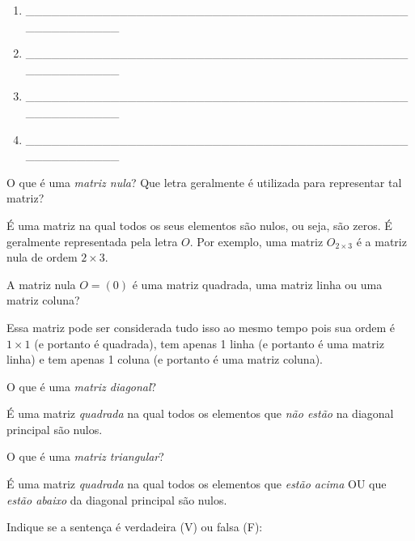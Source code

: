 \documentclass[pdftex, brazil, 12pt, oneside, addpoints, answers]{exam}
\begin{document}
\begin{questions}
\begin{enumerate}
  \item \_\_\_\_\_\_\_\_\_\_\_\_\_\_\_\_\_\_\_\_\_\_\_\_\_\_\_\_\_\_\_\_\_\_\_\_\_\_\_\_\_\_\_\_\_\_\_\_\_\_\_\_\_\_\_\_
  \item \_\_\_\_\_\_\_\_\_\_\_\_\_\_\_\_\_\_\_\_\_\_\_\_\_\_\_\_\_\_\_\_\_\_\_\_\_\_\_\_\_\_\_\_\_\_\_\_\_\_\_\_\_\_\_\_
  \item \_\_\_\_\_\_\_\_\_\_\_\_\_\_\_\_\_\_\_\_\_\_\_\_\_\_\_\_\_\_\_\_\_\_\_\_\_\_\_\_\_\_\_\_\_\_\_\_\_\_\_\_\_\_\_\_
  \item \_\_\_\_\_\_\_\_\_\_\_\_\_\_\_\_\_\_\_\_\_\_\_\_\_\_\_\_\_\_\_\_\_\_\_\_\_\_\_\_\_\_\_\_\_\_\_\_\_\_\_\_\_\_\_\_    
\end{enumerate}
\fi

\ifprintanswers
\newpage
\fi

\question
O que é uma \emph{matriz nula}? Que letra geralmente é utilizada para representar tal matriz?
\begin{solutionorlines}[0.50in]
  É uma matriz na qual todos os seus elementos são nulos, ou seja, são zeros. É geralmente
  representada pela letra $O$. Por exemplo, uma matriz $O_{2 \times 3}$ é a matriz nula
  de ordem $2 \times 3$.
\end{solutionorlines}

\question
A matriz nula $O = (0)$ é uma matriz quadrada, uma matriz linha ou uma matriz coluna?
\begin{solutionorlines}[0.50in]
  Essa matriz pode ser considerada tudo isso ao mesmo tempo pois sua ordem é $1 \times 1$
  (e portanto é quadrada), tem apenas 1 linha (e portanto é uma matriz linha) e tem apenas
  1 coluna (e portanto é uma matriz coluna).
\end{solutionorlines}

\question
O que é uma \emph{matriz diagonal}?
\begin{solutionorlines}[0.50in]
  É uma matriz \emph{quadrada} na qual todos os elementos que \emph{não estão}
  na diagonal principal são nulos.
\end{solutionorlines}

\question
O que é uma \emph{matriz triangular}?
\begin{solutionorlines}[0.50in]
  É uma matriz \emph{quadrada} na qual todos os elementos que \emph{estão acima}
  OU que \emph{estão abaixo} da diagonal principal são nulos.
\end{solutionorlines}

\question
Indique se a sentença é verdadeira (V) ou falsa (F):
\begin{parts}

\end{parts}
\end{questions}
\end{document}

